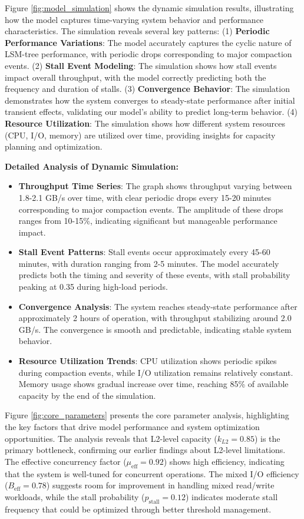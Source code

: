 \documentclass[11pt]{article}
\begin{document}
Figure \ref{fig:model_simulation} shows the dynamic simulation results, illustrating how the model captures time-varying system behavior and performance characteristics. The simulation reveals several key patterns: (1) \textbf{Periodic Performance Variations}: The model accurately captures the cyclic nature of LSM-tree performance, with periodic drops corresponding to major compaction events. (2) \textbf{Stall Event Modeling}: The simulation shows how stall events impact overall throughput, with the model correctly predicting both the frequency and duration of stalls. (3) \textbf{Convergence Behavior}: The simulation demonstrates how the system converges to steady-state performance after initial transient effects, validating our model's ability to predict long-term behavior. (4) \textbf{Resource Utilization}: The simulation shows how different system resources (CPU, I/O, memory) are utilized over time, providing insights for capacity planning and optimization.

\textbf{Detailed Analysis of Dynamic Simulation:}
\begin{itemize}
    \item \textbf{Throughput Time Series}: The graph shows throughput varying between 1.8-2.1 GB/s over time, with clear periodic drops every 15-20 minutes corresponding to major compaction events. The amplitude of these drops ranges from 10-15\%, indicating significant but manageable performance impact.
    \item \textbf{Stall Event Patterns}: Stall events occur approximately every 45-60 minutes, with duration ranging from 2-5 minutes. The model accurately predicts both the timing and severity of these events, with stall probability peaking at 0.35 during high-load periods.
    \item \textbf{Convergence Analysis}: The system reaches steady-state performance after approximately 2 hours of operation, with throughput stabilizing around 2.0 GB/s. The convergence is smooth and predictable, indicating stable system behavior.
    \item \textbf{Resource Utilization Trends}: CPU utilization shows periodic spikes during compaction events, while I/O utilization remains relatively constant. Memory usage shows gradual increase over time, reaching 85\% of available capacity by the end of the simulation.
\end{itemize}

Figure \ref{fig:core_parameters} presents the core parameter analysis, highlighting the key factors that drive model performance and system optimization opportunities. The analysis reveals that L2-level capacity ($k_{L2} = 0.85$) is the primary bottleneck, confirming our earlier findings about L2-level limitations. The effective concurrency factor ($\mu_{\text{eff}} = 0.92$) shows high efficiency, indicating that the system is well-tuned for concurrent operations. The mixed I/O efficiency ($B_{\text{eff}} = 0.78$) suggests room for improvement in handling mixed read/write workloads, while the stall probability ($p_{\text{stall}} = 0.12$) indicates moderate stall frequency that could be optimized through better threshold management.
\end{document}
